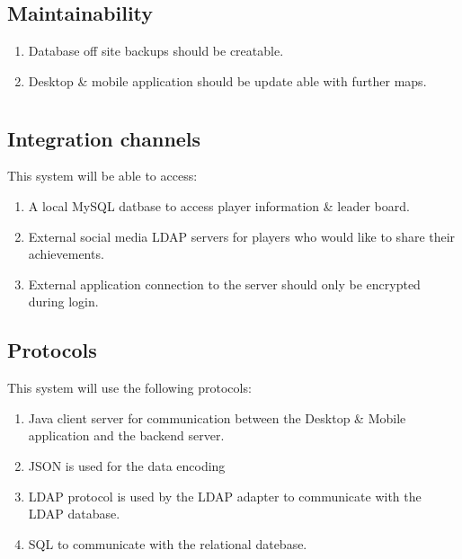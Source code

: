 \documentclass[letterpaper]{article}
\begin{document}
			\subsection*{Maintainability}
			\vspace{0.1in}
			
			\begin{enumerate}
				\item Database off site backups should be creatable.
				\item Desktop \& mobile application should be update able with further maps.
			\end{enumerate}
			
			\vspace{0.2in}
			\section*{\colorbox{blue}{}} 
			\vspace{0.1in}
			
			\subsection*{Integration channels}
			\vspace{0.1in}
			
			This system will be able to access:
			\begin{enumerate}
				\item A local MySQL datbase to access player information \& leader board.
				\item External social media LDAP servers for players who would like to share their achievements.
				\item External application connection to the server should only be encrypted during login.
			\end{enumerate}
		
			\vspace{0.2in}
			\subsection*{Protocols}
			\vspace{0.1in}
		
			This system will use the following protocols:
			\begin{enumerate}
				\item Java client server for communication between the Desktop \& Mobile application and the backend server. 
				\item JSON is used for the data encoding 
				\item LDAP protocol is used by the LDAP adapter to communicate with the LDAP database.
				\item SQL to communicate with the relational datebase.
			\end{enumerate}
		
\end{document}
